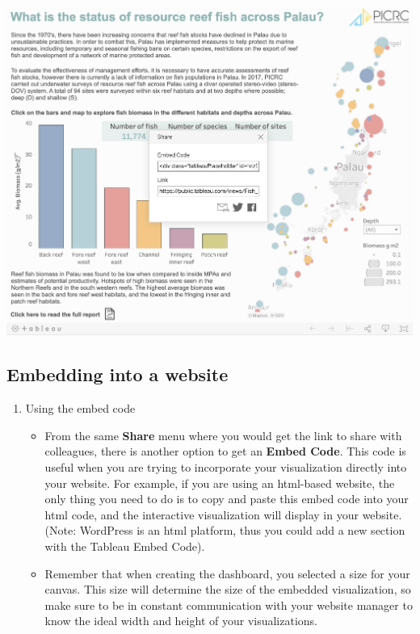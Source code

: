 \documentclass[
]{book}
\providecommand{\tightlist}{%
  \setlength{\itemsep}{0pt}\setlength{\parskip}{0pt}}
\begin{document}
\includegraphics{images/M3S7_tableau_public_link.png}

\hypertarget{embedding-into-a-website}{%
\subsection{Embedding into a website}\label{embedding-into-a-website}}

\begin{enumerate}
\def\labelenumi{\arabic{enumi}.}
\tightlist
\item
  Using the embed code

  \begin{itemize}
  \tightlist
  \item
    From the same \textbf{Share} menu where you would get the link to share with colleagues, there is another option to get an \textbf{Embed Code}. This code is useful when you are trying to incorporate your visualization directly into your website. For example, if you are using an html-based website, the only thing you need to do is to copy and paste this embed code into your html code, and the interactive visualization will display in your website. (Note: WordPress is an html platform, thus you could add a new section with the Tableau Embed Code).
  \item
    Remember that when creating the dashboard, you selected a size for your canvas. This size will determine the size of the embedded visualization, so make sure to be in constant communication with your website manager to know the ideal width and height of your visualizations.
  \end{itemize}
\end{enumerate}
\end{document}

